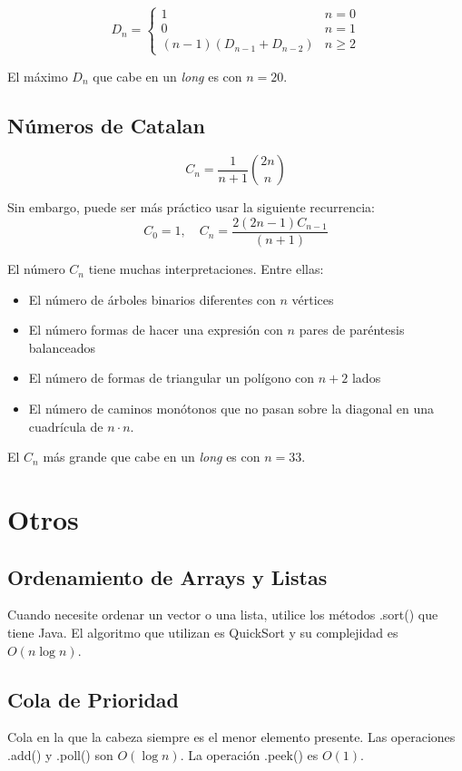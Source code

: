 \documentclass{article}
\begin{document}
\begin{multicols}{2}
	\[
		D_{n} = \left \{ 
			\begin{array}{lcc}
				1 & n = 0
				\\ 0 & n = 1
				\\ (n-1)(D_{n-1} + D_{n-2}) & n \geq 2 
			\end{array}
		\right.
	\]
	
	El máximo \( D_n \) que cabe en un \emph{long} es con \( n=20 \).

	\subsection{Números de Catalan}
	\[
		C_{n} = \frac{1}{n+1} \binom{2n}{n}
	\]

	Sin embargo, puede ser más práctico usar la siguiente recurrencia:
	\[
		C_0 = 1, \quad C_{n} = \frac{2(2n-1)C_{n-1}}{(n+1)}
	\]

	El número \( C_{n} \) tiene muchas interpretaciones. Entre ellas:

	\begin{itemize}
		\item El número de árboles binarios diferentes con \( n \) vértices
		\item El número formas de hacer una expresión con \( n \) pares de paréntesis balanceados
		\item El número de formas de triangular un polígono con \( n+2 \) lados
		\item El número de caminos monótonos que no pasan sobre la diagonal en una cuadrícula de \( n \cdot n \).
	\end{itemize}

	El \( C_{n} \) más grande que cabe en un \emph{long} es con \( n = 33 \). 
		
\section{Otros}
	\subsection{Ordenamiento de Arrays y Listas}
	Cuando necesite ordenar un vector o una lista, utilice los métodos .sort() que tiene 		Java. El algoritmo que utilizan es QuickSort y su complejidad es \( O(n\log n) \).
	
	
	\subsection{Cola de Prioridad}
	Cola en la que la cabeza siempre es el menor elemento presente. Las operaciones .add() y .poll() son \( O(\log n ) \). La operación .peek() es \( O(1) \).
	

\end{multicols}
\end{document}

